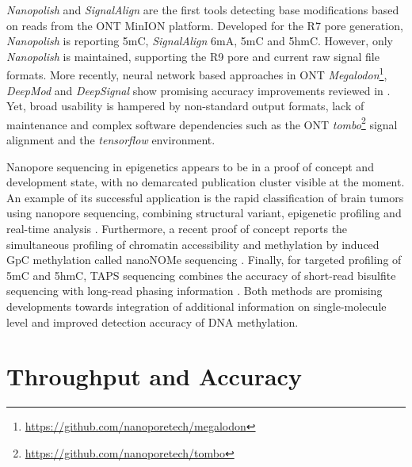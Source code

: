 \textit{Nanopolish} \cite{Simpson2017} and \textit{SignalAlign} \cite{Rand2017} are the first tools detecting base modifications based on reads from the ONT MinION platform.
Developed for the R7 pore generation, \textit{Nanopolish} is reporting 5mC, \textit{SignalAlign} 6mA, 5mC and 5hmC.
However, only \textit{Nanopolish} is maintained, supporting the R9 pore and current raw signal file formats.
More recently, neural network based approaches in ONT \textit{Megalodon}\footnote{\url{https://github.com/nanoporetech/megalodon}}, \textit{DeepMod} \cite{Liu2019a} and \textit{DeepSignal} \cite{Ni2018} show promising accuracy improvements reviewed in \cite{Yuen2020}.
Yet, broad usability is hampered by non-standard output formats, lack of maintenance and complex software dependencies such as the ONT \textit{tombo}\footnote{\url{https://github.com/nanoporetech/tombo}} signal alignment and the \textit{tensorflow} environment.

Nanopore sequencing in epigenetics appears to be in a proof of concept and development state, with no demarcated publication cluster visible at the moment.
An example of its successful application is the rapid classification of brain tumors using nanopore sequencing, combining structural variant, epigenetic profiling and real-time analysis \cite{Euskirchen2017}.
Furthermore, a recent proof of concept reports the simultaneous profiling of chromatin accessibility and methylation by induced GpC methylation called nanoNOMe sequencing \cite{Lee2020}.
Finally, for targeted profiling of 5mC and 5hmC, TAPS sequencing combines the accuracy of short-read bisulfite sequencing with long-read phasing information \cite{Liu2020}.
Both methods are promising developments towards integration of additional information on single-molecule level and improved detection accuracy of DNA methylation.





\section{Throughput and Accuracy}
\label{sec:stat_of_art:throughput}

